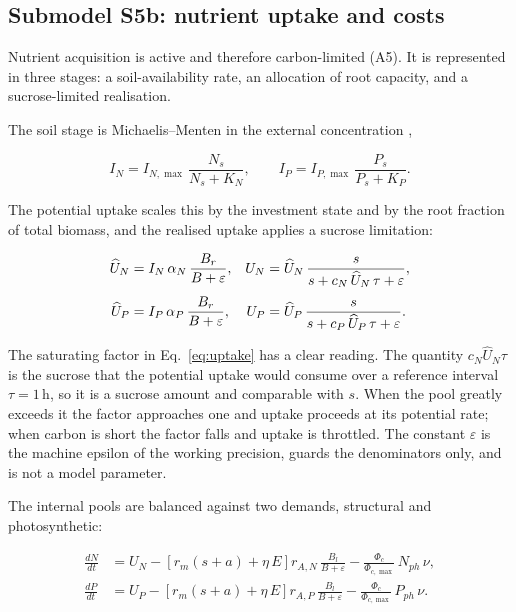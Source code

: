 \subsection{Submodel S5b: nutrient uptake and costs}
\label{sec:nutrients}

Nutrient acquisition is active and therefore carbon-limited (A5). It is
represented in three stages: a soil-availability rate, an allocation of root
capacity, and a sucrose-limited realisation.

The soil stage is Michaelis--Menten in the external concentration
\citep{Epstein1952,Tinker2000},

\begin{equation}
I_N = I_{N,\max}\,\frac{N_s}{N_s + K_N},
\qquad
I_P = I_{P,\max}\,\frac{P_s}{P_s + K_P} .
\label{eq:soil_uptake}
\end{equation}

The potential uptake scales this by the investment state and by the root
fraction of total biomass, and the realised uptake applies a sucrose limitation:

\begin{align}
\widehat{U}_N &= I_N\,\alpha_N\,\frac{B_r}{B + \varepsilon},
&
U_N &= \widehat{U}_N\,
\frac{s}{s + c_N\,\widehat{U}_N\,\tau + \varepsilon},
\label{eq:uptake}\\[3pt]
\widehat{U}_P &= I_P\,\alpha_P\,\frac{B_r}{B + \varepsilon},
&
U_P &= \widehat{U}_P\,
\frac{s}{s + c_P\,\widehat{U}_P\,\tau + \varepsilon} .
\notag
\end{align}

The saturating factor in Eq.~\eqref{eq:uptake} has a clear reading. The quantity
$c_N \widehat{U}_N \tau$ is the sucrose that the potential uptake would consume
over a reference interval $\tau = 1\,\mathrm{h}$, so it is a sucrose amount and
comparable with $s$. When the pool greatly exceeds it the factor approaches one and
uptake proceeds at its potential rate; when carbon is short the factor falls and
uptake is throttled. The constant $\varepsilon$ is the machine epsilon of the
working precision, guards the denominators only, and is not a model parameter.

The internal pools are balanced against two demands, structural and
photosynthetic:

\begin{align}
\frac{dN}{dt} &= U_N
- \left[r_m\left(s+a\right) + \eta\,E\right] r_{A,N}\,\frac{B_l}{B+\varepsilon}
- \frac{\Phi_c}{\Phi_{c,\max}}\,N_{ph}\,\nu ,
\label{eq:dN}\\[3pt]
\frac{dP}{dt} &= U_P
- \left[r_m\left(s+a\right) + \eta\,E\right] r_{A,P}\,\frac{B_l}{B+\varepsilon}
- \frac{\Phi_c}{\Phi_{c,\max}}\,P_{ph}\,\nu .
\label{eq:dP}
\end{align}

